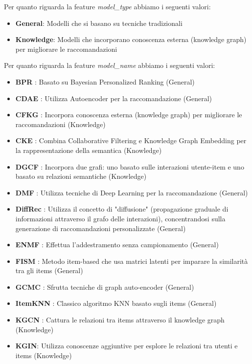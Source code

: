 Per quanto riguarda la feature \textit{model\_type} abbiamo i seguenti valori:
\begin{itemize}
    \item \textbf{General}: Modelli che si basano su tecniche tradizionali
    \item \textbf{Knowledge}: Modelli che incorporano conoscenza esterna (knowledge graph) per migliorare le raccomandazioni
\end{itemize}

Per quanto riguarda la feature \textit{model\_name} abbiamo i seguenti valori:
\begin{itemize}
    \item \textbf{BPR} \cite{BPR}: Basato su Bayesian Personalized Ranking (General)
    \item \textbf{CDAE} \cite{CDAE}: Utilizza Autoencoder per la raccomandazione (General)
    \item \textbf{CFKG} \cite{CFKG}: Incorpora conoscenza esterna (knowledge graph) per migliorare le raccomandazioni  (Knowledge)
    \item \textbf{CKE} \cite{CKE}: Combina Collaborative Filtering e Knowledge Graph Embedding per la rappresentazione della semantica (Knowledge)
    \item \textbf{DGCF} \cite{DGCF}: Incorpora due grafi: uno basato sulle interazioni utente-item e uno basato su relazioni semantiche (Knowledge)
    \item \textbf{DMF} \cite{DMF}: Utilizza tecniche di Deep Learning per la raccomandazione (General)
    \item \textbf{DiffRec} \cite{DiffRec}: Utilizza il concetto di "diffusione" (propagazione graduale di informazioni attraverso il grafo delle interazioni), concentrandosi sulla generazione di raccomandazioni personalizzate (General)
    \item \textbf{ENMF} \cite{ENMF}: Effettua l'addestramento senza campionamento (General) 
    \item \textbf{FISM} \cite{FISM}: Metodo item-based che usa matrici latenti per imparare la similarità tra gli items (General)
    \item \textbf{GCMC} \cite{GCMC}: Sfrutta tecniche di graph auto-encoder (General)
    \item \textbf{ItemKNN} \cite{ItemKNN}: Classico algoritmo KNN basato sugli items (General)
    \item \textbf{KGCN} \cite{KGCN}: Cattura le relazioni tra items attraverso il knowledge graph (Knowledge)
    \item \textbf{KGIN}: \cite{KGIN} Utilizza conoscenze aggiuntive per esplore le relazioni tra utenti e items (Knowledge)

\end{itemize}
